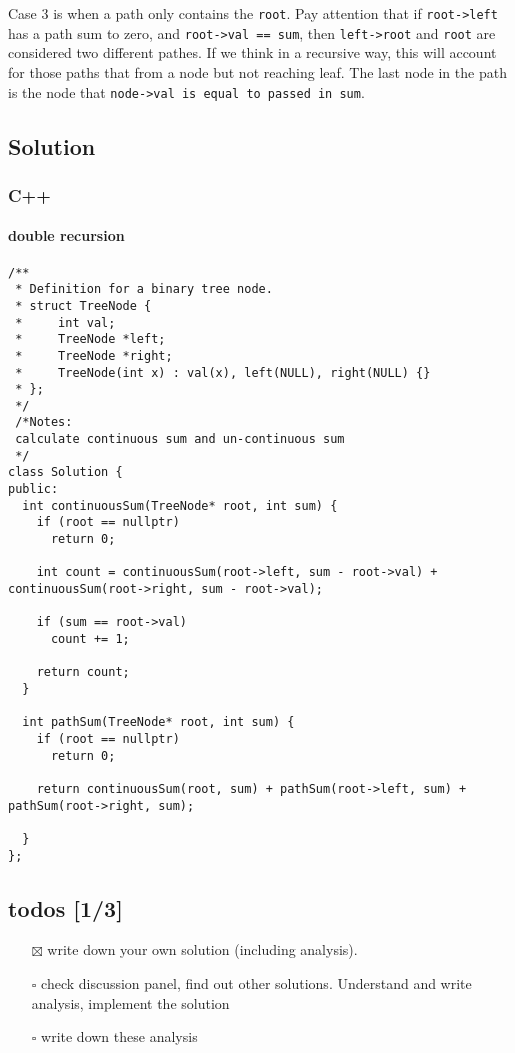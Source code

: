 \documentclass[12pt]{article}
\begin{document}
Case 3 is when a path only contains the \texttt{root}. Pay attention that if \texttt{root->left} has a path sum to zero, and \texttt{root->val == sum}, then \texttt{left->root} and \texttt{root} are considered two different pathes. If we think in a recursive way, this will account for those paths that from a node but not reaching leaf. The last node in the path is the node that \texttt{node->val is equal to passed in sum}.
\subsection{Solution}
\label{sec:org3937230}
\subsubsection{C++}
\label{sec:org1e1237f}
\paragraph{double recursion}
\label{sec:orgd69a32b}
\begin{verbatim}
/**
 * Definition for a binary tree node.
 * struct TreeNode {
 *     int val;
 *     TreeNode *left;
 *     TreeNode *right;
 *     TreeNode(int x) : val(x), left(NULL), right(NULL) {}
 * };
 */
 /*Notes: 
 calculate continuous sum and un-continuous sum
 */
class Solution {
public:
  int continuousSum(TreeNode* root, int sum) {
    if (root == nullptr)
      return 0;

    int count = continuousSum(root->left, sum - root->val) + continuousSum(root->right, sum - root->val);

    if (sum == root->val)
      count += 1;

    return count;
  }

  int pathSum(TreeNode* root, int sum) {
    if (root == nullptr)
      return 0;

    return continuousSum(root, sum) + pathSum(root->left, sum) + pathSum(root->right, sum);

  }
};
\end{verbatim}
\subsection{todos [1/3]}
\label{sec:org7d632b2}
\begin{itemize}
\item[{$\boxtimes$}] write down your own solution (including analysis).
\item[{$\square$}] check discussion panel, find out other solutions. Understand and write analysis, implement the solution
\item[{$\square$}] write down these analysis
\end{itemize}
\end{document}

